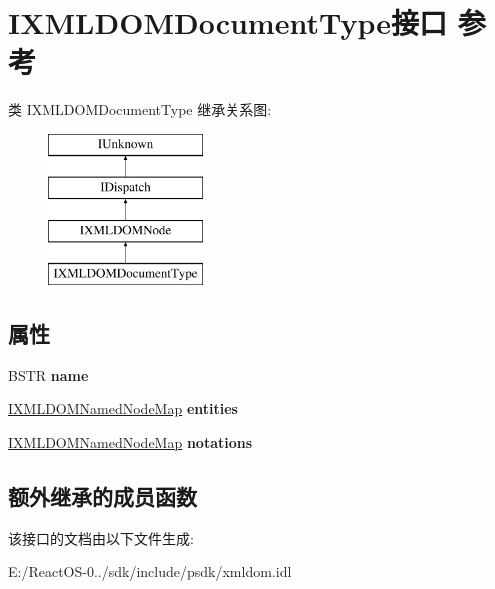 \hypertarget{interface_i_x_m_l_d_o_m_document_type}{}\section{I\+X\+M\+L\+D\+O\+M\+Document\+Type接口 参考}
\label{interface_i_x_m_l_d_o_m_document_type}
类 I\+X\+M\+L\+D\+O\+M\+Document\+Type 继承关系图\+:\begin{figure}[H]
\begin{center}
\leavevmode
\includegraphics[height=4.000000cm]{interface_i_x_m_l_d_o_m_document_type}
\end{center}
\end{figure}
\subsection*{属性}
\begin{DoxyCompactItemize}
\item 
\mbox{\label{interface_i_x_m_l_d_o_m_document_type_ad89e9b99cdbbb02508b24efa85883035}} 
B\+S\+TR {\bfseries name}
\item 
\mbox{\label{interface_i_x_m_l_d_o_m_document_type_aa99188c4db0b9cbf9ec49e4053637b3b}} 
\hyperlink{interface_i_x_m_l_d_o_m_named_node_map}{I\+X\+M\+L\+D\+O\+M\+Named\+Node\+Map} {\bfseries entities}
\item 
\mbox{\label{interface_i_x_m_l_d_o_m_document_type_a2ef8c52e55f9c93ca90ca97102c35336}} 
\hyperlink{interface_i_x_m_l_d_o_m_named_node_map}{I\+X\+M\+L\+D\+O\+M\+Named\+Node\+Map} {\bfseries notations}
\end{DoxyCompactItemize}
\subsection*{额外继承的成员函数}


该接口的文档由以下文件生成\+:\begin{DoxyCompactItemize}
\item 
E\+:/\+React\+O\+S-\/0../sdk/include/psdk/xmldom.\+idl\end{DoxyCompactItemize}
